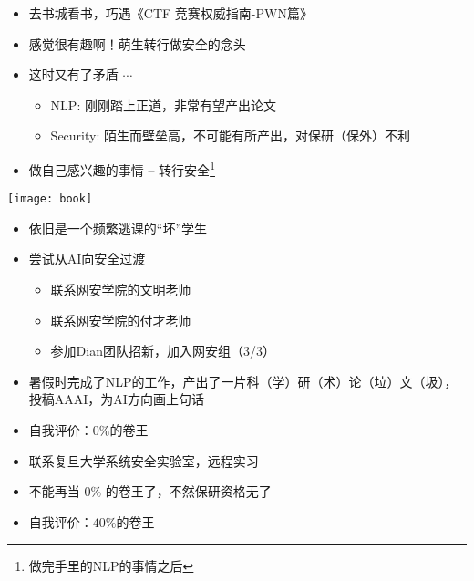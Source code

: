 \documentclass{ctexbeamer} %
\begin{document}
\begin{frame}
	\begin{itemize}
		\item 去书城看书，巧遇《CTF 竞赛权威指南-PWN篇》
		\item 感觉很有趣啊！萌生转行做安全的念头
		\item 这时又有了矛盾 $\cdots$
		\begin{itemize}
			\item NLP: 刚刚踏上正道，非常有望产出论文
			\item Security: 陌生而壁垒高，不可能有所产出，对保研（保外）不利
		\end{itemize}
		\item 做自己感兴趣的事情 -- 转行安全\footnote{做完手里的NLP的事情之后}
	\end{itemize}
	\begin{center}
		\texttt{[image: book]}
	\end{center}
\end{frame}

\begin{frame}
	\begin{itemize}
		\item 依旧是一个频繁逃课的“坏”学生
		\item 尝试从AI向安全过渡
		\begin{itemize}
			\item 联系网安学院的文明老师
			\item 联系网安学院的付才老师
			\item 参加Dian团队招新，加入网安组（3/3）
		\end{itemize}
		\item 暑假时完成了NLP的工作，产出了一片科（学）研（术）论（垃）文（圾），投稿AAAI，为AI方向画上句话
		\item 自我评价：$0\%$的卷王
	\end{itemize}
\end{frame}

\begin{frame}
	\begin{itemize}
		\item 联系复旦大学系统安全实验室，远程实习
		\item 不能再当 $0\%$ 的卷王了，不然保研资格无了
		\item 自我评价：$40\%$的卷王
	\end{itemize}
\end{frame}
\end{document}
